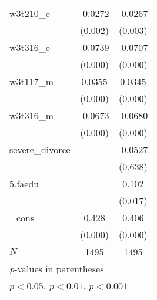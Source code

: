 {\begin{tabular}{l*{2}{c}}
w3t210\_e    &     -0.0272\sym{**} &     -0.0267\sym{**} \\
            &     (0.002)         &     (0.003)         \\
[1em]
w3t316\_e    &     -0.0739\sym{***}&     -0.0707\sym{***}\\
            &     (0.000)         &     (0.000)         \\
[1em]
w3t117\_m    &      0.0355\sym{***}&      0.0345\sym{***}\\
            &     (0.000)         &     (0.000)         \\
[1em]
w3t316\_m    &     -0.0673\sym{***}&     -0.0680\sym{***}\\
            &     (0.000)         &     (0.000)         \\
[1em]
severe\_divorce&                     &     -0.0527         \\
            &                     &     (0.638)         \\
[1em]
5.faedu     &                     &       0.102\sym{*}  \\
            &                     &     (0.017)         \\
[1em]
\_cons      &       0.428\sym{***}&       0.406\sym{***}\\
            &     (0.000)         &     (0.000)         \\
\hline
\(N\)       &        1495         &        1495         \\
\hline\hline
\multicolumn{3}{l}{\footnotesize \textit{p}-values in parentheses}\\
\multicolumn{3}{l}{\footnotesize \sym{*} \(p<0.05\), \sym{**} \(p<0.01\), \sym{***} \(p<0.001\)}\\
\end{tabular}
}
